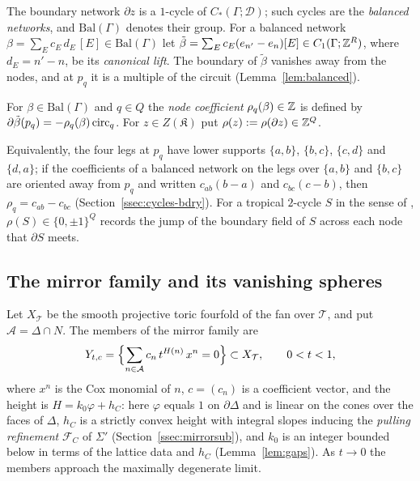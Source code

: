 The boundary network $\partial z$ is a $1$-cycle of $C_*(\Gamma;\mathcal D)$; such cycles are the \emph{balanced
networks}, and $\mathrm{Bal}(\Gamma)$ denotes their group. For a balanced network $\beta=\sum_Ec_E\,d_E\,[E]\in\mathrm{Bal}(\Gamma)$ let
$\tilde\beta=\sum_Ec_E(e_{n'}-e_n)[E]\in C_1(\Gamma;\mathbb Z^R)$, where $d_E=n'-n$, be its \emph{canonical lift}. The boundary of
$\tilde\beta$ vanishes away from the nodes, and at $p_q$ it is a multiple of the circuit (Lemma~\ref{lem:balanced}).

\begin{definition}\label{def:nodecoef}
For $\beta\in\mathrm{Bal}(\Gamma)$ and $q\in Q$ the \emph{node coefficient} $\rho_q(\beta)\in\mathbb Z$ is defined by
$\partial\tilde\beta(p_q)=-\rho_q(\beta)\,\mathrm{circ}_q$. For $z\in Z(\mathfrak K)$ put $\rho(z):=\rho(\partial z)\in\mathbb Z^Q$.
\end{definition}

Equivalently, the four legs at $p_q$ have lower supports $\{a,b\}$, $\{b,c\}$, $\{c,d\}$ and $\{d,a\}$; if the
coefficients of a balanced network on the legs over $\{a,b\}$ and $\{b,c\}$ are oriented away from $p_q$ and written
$c_{ab}(b-a)$ and $c_{bc}(c-b)$, then $\rho_q=c_{ab}-c_{bc}$
(Section~\ref{ssec:cycles-bdry}). For a tropical $2$-cycle $S$ in the sense of \cite{CBM}, $\rho(S)\in\{0,\pm1\}^Q$
records the jump of the boundary field of $S$ across each node that $\partial S$ meets.

\subsection{The mirror family and its vanishing spheres}\label{ssec:mirrorfamily}
Let $X_{\mathcal T}$ be the smooth projective toric fourfold of the fan over $\mathcal T$, and put $\mathcal A=\Delta\cap N$.
The members of the mirror family are
\[
Y_{t,c}=\Bigl\{\sum_{n\in\mathcal A}c_n\,t^{H(n)}\,x^n=0\Bigr\}\subset X_{\mathcal T},\qquad 0<t<1,
\]
where $x^n$ is the Cox monomial of $n$, $c=(c_n)$ is a coefficient vector, and the height is $H=k_0\varphi+h_C$: here
$\varphi$ equals $1$ on $\partial\Delta$ and is linear on the cones over the faces of $\Delta$, $h_C$ is a strictly
convex height with integral slopes inducing the \emph{pulling refinement} $\mathcal F_C$ of $\Sigma'$
(Section~\ref{ssec:mirrorsub}), and $k_0$ is an integer bounded below in terms of the lattice data and $h_C$ (Lemma~\ref{lem:gaps}). As
$t\to0$ the members approach the maximally degenerate limit.

